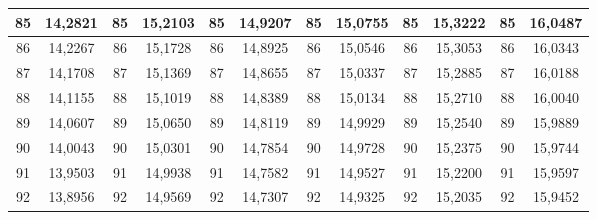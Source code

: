 \documentclass[a4paper,12pt]{article} %
\begin{document}
\begin{longtable}[c]{cccccccccc|c|c|}
	\multicolumn{1}{|c|}{85} & \multicolumn{1}{c|}{14,2821} & \multicolumn{1}{c|}{85} & \multicolumn{1}{c|}{15,2103} & \multicolumn{1}{c|}{85} & \multicolumn{1}{c|}{14,9207} & \multicolumn{1}{c|}{85} & \multicolumn{1}{c|}{15,0755} & \multicolumn{1}{c|}{85} & 15,3222 & 85 & 16,0487 \\ \hline
	\multicolumn{1}{|c|}{86} & \multicolumn{1}{c|}{14,2267} & \multicolumn{1}{c|}{86} & \multicolumn{1}{c|}{15,1728} & \multicolumn{1}{c|}{86} & \multicolumn{1}{c|}{14,8925} & \multicolumn{1}{c|}{86} & \multicolumn{1}{c|}{15,0546} & \multicolumn{1}{c|}{86} & 15,3053 & 86 & 16,0343 \\ \hline
	\multicolumn{1}{|c|}{87} & \multicolumn{1}{c|}{14,1708} & \multicolumn{1}{c|}{87} & \multicolumn{1}{c|}{15,1369} & \multicolumn{1}{c|}{87} & \multicolumn{1}{c|}{14,8655} & \multicolumn{1}{c|}{87} & \multicolumn{1}{c|}{15,0337} & \multicolumn{1}{c|}{87} & 15,2885 & 87 & 16,0188 \\ \hline
	\multicolumn{1}{|c|}{88} & \multicolumn{1}{c|}{14,1155} & \multicolumn{1}{c|}{88} & \multicolumn{1}{c|}{15,1019} & \multicolumn{1}{c|}{88} & \multicolumn{1}{c|}{14,8389} & \multicolumn{1}{c|}{88} & \multicolumn{1}{c|}{15,0134} & \multicolumn{1}{c|}{88} & 15,2710 & 88 & 16,0040 \\ \hline
	\multicolumn{1}{|c|}{89} & \multicolumn{1}{c|}{14,0607} & \multicolumn{1}{c|}{89} & \multicolumn{1}{c|}{15,0650} & \multicolumn{1}{c|}{89} & \multicolumn{1}{c|}{14,8119} & \multicolumn{1}{c|}{89} & \multicolumn{1}{c|}{14,9929} & \multicolumn{1}{c|}{89} & 15,2540 & 89 & 15,9889 \\ \hline
	\multicolumn{1}{|c|}{90} & \multicolumn{1}{c|}{14,0043} & \multicolumn{1}{c|}{90} & \multicolumn{1}{c|}{15,0301} & \multicolumn{1}{c|}{90} & \multicolumn{1}{c|}{14,7854} & \multicolumn{1}{c|}{90} & \multicolumn{1}{c|}{14,9728} & \multicolumn{1}{c|}{90} & 15,2375 & 90 & 15,9744 \\ \hline
	\multicolumn{1}{|c|}{91} & \multicolumn{1}{c|}{13,9503} & \multicolumn{1}{c|}{91} & \multicolumn{1}{c|}{14,9938} & \multicolumn{1}{c|}{91} & \multicolumn{1}{c|}{14,7582} & \multicolumn{1}{c|}{91} & \multicolumn{1}{c|}{14,9527} & \multicolumn{1}{c|}{91} & 15,2200 & 91 & 15,9597 \\ \hline
	\multicolumn{1}{|c|}{92} & \multicolumn{1}{c|}{13,8956} & \multicolumn{1}{c|}{92} & \multicolumn{1}{c|}{14,9569} & \multicolumn{1}{c|}{92} & \multicolumn{1}{c|}{14,7307} & \multicolumn{1}{c|}{92} & \multicolumn{1}{c|}{14,9325} & \multicolumn{1}{c|}{92} & 15,2035 & 92 & 15,9452 \\ \hline

\end{longtable}
\end{document}
